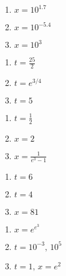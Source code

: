 \documentclass{ximera}
\begin{document}
\begin{enumerate}
\setcounter{enumi}{\value{HW}}

\item $x = 10^{1.7}$
\item $x = 10^{-5.4}$
\item $x = 10^{3}$

\setcounter{HW}{\value{enumi}}
\end{enumerate}

\begin{enumerate}
\setcounter{enumi}{\value{HW}}

\item $t=\frac{25}{2}$
\item $t=e^{3/4}$
\item $t = 5$

\setcounter{HW}{\value{enumi}}
\end{enumerate}

\begin{enumerate}
\setcounter{enumi}{\value{HW}}

\item $t = \frac{1}{2}$
\item $x = 2$
\item $x = \frac{1}{e^3-1}$

\setcounter{HW}{\value{enumi}}
\end{enumerate}

\begin{enumerate}
\setcounter{enumi}{\value{HW}}

\item $t=6$
\item $t=4$
\item $x = 81$

\setcounter{HW}{\value{enumi}}
\end{enumerate}

\begin{enumerate}
\setcounter{enumi}{\value{HW}}

\item $x = e^{e^3}$
\item $t=10^{-3}, \, 10^{5}$
\item $t = 1, \, x = e^{2}$

\setcounter{HW}{\value{enumi}}
\end{enumerate}
\end{document}
